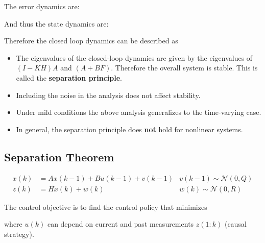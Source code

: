 \documentclass[10pt,a4paper]{scrartcl}
\begin{document}
\begin{multicols*}{2}
The error dynamics are:


And thus the state dynamics are: 


Therefore the closed loop dynamics can be described as


\begin{itemize}
\item The eigenvalues of the closed-loop dynamics are given by the eigenvalues of $(I-KH)A$ and $(A+BF)$. Therefore the overall system is stable. This is called the \textbf{separation principle}.
\item Including the noise in the analysis does not affect stability.
\item Under mild conditions the above analysis generalizes to the time-varying case.
\item In general, the separation principle does \textbf{not} hold for nonlinear systems.
\end{itemize}

\subsection{Separation Theorem}

\begin{align*}
x(k)&=Ax(k-1)+Bu(k-1)+v(k-1)&v(k-1)\sim\mathcal{N}(0,Q)\\
z(k)&=Hx(k)+w(k)&w(k)\sim\mathcal{N}(0,R)
\end{align*}

The control objective is to find the control policy that minimizes


where $u(k)$ can depend on current and past measurements $z(1:k)$ (causal strategy).


\end{multicols*}
\end{document}
